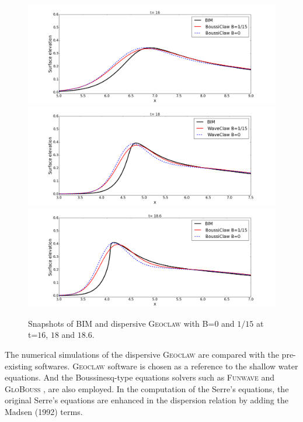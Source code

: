 \documentclass[review]{elsarticle}
\begin{document}
\begin{figure}[!htb]
\centering
\includegraphics[width=.9\textwidth]{_fig/bim_dgeo_160.png}\\
\includegraphics[width=.9\textwidth]{_fig/bim_dgeo_180.png}\\
\includegraphics[width=.9\textwidth]{_fig/bim_dgeo_186.png}
\caption{Snapshots of BIM and dispersive \textsc{Geoclaw} with B=$0$ and $1/15$ at t=$16$, $18$ and $18.6$.}
\label{fig:bim_dgeo}
\end{figure}

The numerical simulations of 
the dispersive \textsc{Geoclaw} are compared
with the pre-existing softwares. 
\textsc{Geoclaw} software \cite{clawpack} is chosen
as a reference to the shallow water equations.
And the Boussinesq-type equations solvers
such as \textsc{Funwave} \cite{shi2012high}
and \textsc{GloBouss} \cite{lovholt2010coupling}, are also employed. 
In the computation of the Serre's equations, 
the original Serre's equations are enhanced in the dispersion relation
by adding the Madsen (1992) \cite{madsen1992new} terms. 
\end{document}
